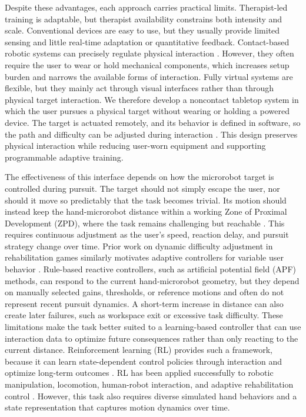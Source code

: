 \documentclass[journal,twoside,web]{ieeecolor2}
\begin{document}
Despite these advantages, each approach carries practical limits. Therapist-led training is adaptable, but therapist availability constrains both intensity and scale. Conventional devices are easy to use, but they usually provide limited sensing and little real-time adaptation or quantitative feedback. Contact-based robotic systems can precisely regulate physical interaction \cite{arantesAdaptiveAAN2023}. However, they often require the user to wear or hold mechanical components, which increases setup burden and narrows the available forms of interaction. Fully virtual systems are flexible, but they mainly act through visual interfaces rather than through physical target interaction. We therefore develop a noncontact tabletop system in which the user pursues a physical target without wearing or holding a powered device. The target is actuated remotely, and its behavior is defined in software, so the path and difficulty can be adjusted during interaction \cite{sittiBiomedicalMicrorobots2015,yangMagneticActuation2020,miaoSoftMagneticRobots2023}. This design preserves physical interaction while reducing user-worn equipment and supporting programmable adaptive training.

The effectiveness of this interface depends on how the microrobot target is controlled during pursuit. The target should not simply escape the user, nor should it move so predictably that the task becomes trivial. Its motion should instead keep the hand-microrobot distance within a working Zone of Proximal Development (ZPD), where the task remains challenging but reachable \cite{vygotskyMindSociety1978,hocineSeriousGameAdaptation2015}. This requires continuous adjustment as the user's speed, reaction delay, and pursuit strategy change over time. Prior work on dynamic difficulty adjustment in rehabilitation games similarly motivates adaptive controllers for variable user behavior \cite{shangDynamicDifficulty2025,ajaniParetoDDA2023,vitekovaDDAReview2026}. Rule-based reactive controllers, such as artificial potential field (APF) methods, can respond to the current hand-microrobot geometry, but they depend on manually selected gains, thresholds, or reference motions and often do not represent recent pursuit dynamics. A short-term increase in distance can also create later failures, such as workspace exit or excessive task difficulty. These limitations make the task better suited to a learning-based controller that can use interaction data to optimize future consequences rather than only reacting to the current distance. Reinforcement learning (RL) provides such a framework, because it can learn state-dependent control policies through interaction and optimize long-term outcomes \cite{suttonBartoRL2018}. RL has been applied successfully to robotic manipulation, locomotion, human-robot interaction, and adaptive rehabilitation control \cite{koberRLRobotics2013,schulmanPPO2017,molleOnlineRLRehab2025,pareekAR3n2024,zhangImpedanceLandscapes2022,pelosiPersonalizedRehab2024}. However, this task also requires diverse simulated hand behaviors and a state representation that captures motion dynamics over time.
\end{document}
